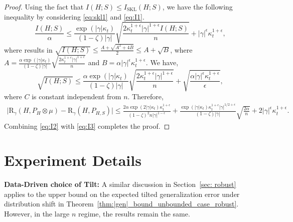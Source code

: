 \documentclass{article}
\theoremstyle{plain}
\theoremstyle{plain}
\theoremstyle{definition}
\theoremstyle{remark}
\newcommand{\RTET}{\mathrm{R}_{\gamma}}
\begin{document}
\begin{proof}
    Using the fact that $I(H;S)\leq I_{\mathrm{SKL}}(H;S)$, we have the following inequality by considering \eqref{eq:skl1} and \eqref{eq:I1}.
    \begin{equation}
        \frac{I(H;S)}{\alpha}\leq  \frac{\exp(|\gamma| \kappa_t)}{(1-\zeta)|\gamma|} \sqrt{\frac{2\kappa_t^{1+\epsilon}|\gamma|^{1+\epsilon} I(H;S)}{n}}+|\gamma|^{\epsilon}\kappa_t^{1+\epsilon},
    \end{equation}
    where results in $\sqrt{I(H;S)}\leq \frac{A+\sqrt{A^2+4B}}{2}\leq A+\sqrt{B}$, where $A=\frac{\alpha\exp(|\gamma| \kappa_t)}{(1-\zeta)|\gamma|} \sqrt{\frac{2\kappa_t^{1+\epsilon}|\gamma|^{1+\epsilon} }{n}}$ and $B=\alpha|\gamma|^{\epsilon}\kappa_t^{1+\epsilon}$. We have,
    \[\sqrt{I(H;S)}\leq \frac{\alpha\exp(|\gamma| \kappa_t)}{(1-\zeta)|\gamma|} \sqrt{\frac{2\kappa_t^{1+\epsilon}|\gamma|^{1+\epsilon} }{n}}+\sqrt{\frac{\alpha|\gamma|^{\epsilon}\kappa_t^{1+\epsilon}}{\epsilon}}, \]
   where $C$ is constant independent from $n$. Therefore, 
    \begin{equation}\label{eq:I2}
        \begin{split}
         \big|\RTET(H,P_{H}\otimes \mu)-\RTET(H,P_{H,S})\big|\leq       \frac{2\alpha\exp(2|\gamma| \kappa_t)\kappa_t^{1+\epsilon}}{(1-\zeta)^2 n|\gamma|^{1-\epsilon}} +\frac{\exp(|\gamma|\kappa_t)\kappa_t^{1+\epsilon}|\gamma|^{1/2+\epsilon}}{(1-\zeta)|\gamma|}\sqrt{\frac{2\alpha}{n}}+2|\gamma|^{\epsilon}\kappa_t^{1+\epsilon}.
        \end{split}
    \end{equation}
    Combining \eqref{eq:I2} with \eqref{eq:I3} completes the proof.
    \end{proof}

\section{Experiment Details}\label{app:experiemnt_details}
\textbf{Data-Driven choice of Tilt:} A similar discussion in Section~\ref{sec: robust} applies to the upper bound on the expected tilted generalization error under distribution shift in Theorem~\ref{thm:|gen|_bound_unbounded_case_robust}. However, in the large $n$ regime, the results remain the same.
\end{document}
